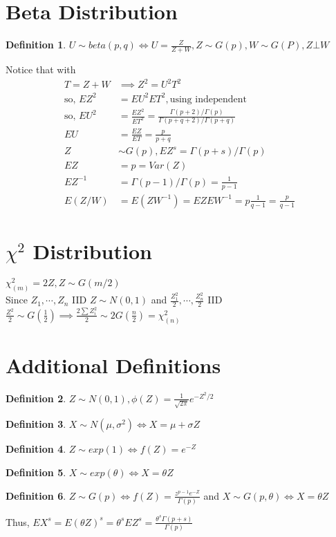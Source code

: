 \documentclass{article}
\theoremstyle{definition}
\newtheorem{definition}{Definition}[section]
\theoremstyle{thrm}
\theoremstyle{lma}
\theoremstyle{ppst}
\theoremstyle{crlr}
\begin{document}
\section{Beta Distribution}
\begin{definition}
	$U\sim beta(p,q) \iff U = \frac{Z}{Z+W}, Z\sim G(p), W\sim G(P), Z\bot W$
\end{definition}
Notice that with 
\begin{align*}
	T = Z+W &\implies Z^2 = U^2T^2\\
	\text{so, } EZ^2 &= EU^2ET^2, \text{using independent}\\
	\text{so, } EU^2 &= \frac{EZ^2}{ET^2} = \frac{\Gamma(p+2)/\Gamma(p)}{\Gamma(p+q+2)/\Gamma(p+q)}\\
	EU &=\frac{EZ}{ET} = \frac{p}{p+q}\\
	Z&\sim G(p), EZ^s = \Gamma(p+s)/\Gamma(p)\\
	EZ &= p = Var(Z)\\
	EZ^{-1} &= \Gamma(p-1)/\Gamma(p) = \frac{1}{p-1}\\
	E(Z/W)&=E(ZW^{-1}) = EZEW^{-1} = p\frac{1}{q-1} = \frac{p}{q-1} 
\end{align*}

\section{$\chi^2$ Distribution}
$\chi_{(m)}^2 = 2Z, Z\sim G(m/2)$\\
Since $Z_1, \cdots, Z_n$ IID $Z\sim N(0,1)$ and $\frac{Z_1^2}{2},\cdots, \frac{Z_n^2}{2}$ IID $\frac{Z^2}{2}\sim G(\frac{1}{2}) \implies \frac{2\sum Z_i^2}{2} \sim 2G(\frac{n}{2}) = \chi_{(n)}^2$

\section{Additional Definitions}
\begin{definition}
	$Z\sim N(0,1), \phi(Z) = \frac{1}{\sqrt{2\pi}}e^{-Z^2/2}$
\end{definition}
\begin{definition}
	$X\sim N(\mu,\sigma^2) \iff X = \mu+\sigma Z$
\end{definition}
\begin{definition}
	$Z \sim exp(1) \iff f(Z) = e^{-Z}$
\end{definition}
\begin{definition}
	$X \sim exp(\theta) \iff X = \theta Z$
\end{definition}
\begin{definition}
	$Z\sim G(p) \iff f(Z) = \frac{z^{p-1}e^{-Z}}{\Gamma(p)}$ and $X\sim G(p,\theta) \iff X = \theta Z$
\end{definition}
Thus, $EX^s = E(\theta Z)^s = \theta^sEZ^s = \frac{\theta^s \Gamma(p+s)}{\Gamma(p)}$
\end{document}
